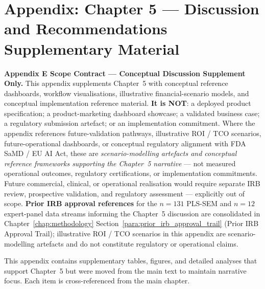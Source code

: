 
\chapter*{Appendix: Chapter 5 --- Discussion and Recommendations Supplementary Material}
\label{chap:appendix_ch5}
\normalsize\normalfont\color{black}
\label{fig:clinical_workflow}


\noindent\textbf{Appendix E Scope Contract --- Conceptual Discussion Supplement Only.}
\label{para:appe_scope_contract}
This appendix supplements Chapter~5 with conceptual reference dashboards, workflow visualisations, illustrative financial-scenario models, and conceptual implementation reference material. \textbf{It is NOT}: a deployed product specification; a product-marketing dashboard showcase; a validated business case; a regulatory submission artefact; or an implementation commitment. Where the appendix references future-validation pathways, illustrative ROI / TCO scenarios, future-operational dashboards, or conceptual regulatory alignment with FDA SaMD / EU AI Act, these are \emph{scenario-modelling artefacts and conceptual reference frameworks supporting the Chapter~5 narrative} --- not measured operational outcomes, regulatory certifications, or implementation commitments. Future commercial, clinical, or operational realisation would require separate IRB review, prospective validation, and regulatory assessment --- explicitly out of scope. \textbf{Prior IRB approval references} for the $n{=}131$ PLS-SEM and $n{=}12$ expert-panel data streams informing the Chapter~5 discussion are consolidated in Chapter~\ref{chap:methodology} Section~\ref{para:prior_irb_approval_trail} (Prior IRB Approval Trail); illustrative ROI / TCO scenarios in this appendix are scenario-modelling artefacts and do not constitute regulatory or operational claims.

This appendix contains supplementary tables, figures, and detailed analyses that support Chapter~5 but were moved from the main text to maintain narrative focus. Each item is cross-referenced from the main chapter.


